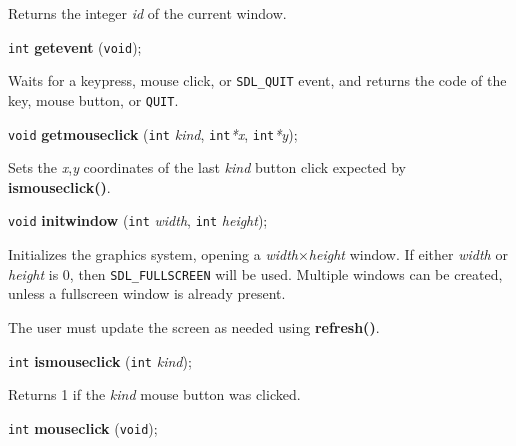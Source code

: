 \documentclass[a4paper,11pt]{article}
\newcommand{\V}{\texttt{void}}      %
\newcommand{\I}{\texttt{int}}       %
\newcommand{\func}[1]{\textbf{#1}}  %
\newcommand{\A}[1]{\emph{#1}}       %
\newcommand{\T}[1]{\texttt{#1}}     %
\newenvironment{bgi}
{ %
  \begin{snugshade}
}
{ %
  \end{snugshade}
}
\begin{document}
Returns the integer \A{id} of the current window.


\begin{bgi}
\I{} \func{getevent} (\V{});
\end{bgi}

Waits for a keypress, mouse click, or \T{SDL\_QUIT} event, and returns
the code of the key, mouse button, or \T{QUIT}.








\begin{bgi}
\V{} \func{getmouseclick} (\I{} \A{kind}, \I{}\A{*x}, \I{}\A{*y});
\end{bgi}

Sets the \A{x},\A{y} coordinates of the last \A{kind} button click
expected by \func{ismouseclick()}.


\begin{bgi}
\V{} \func{initwindow} (\I{} \A{width}, \I{} \A{height});
\end{bgi}

Initializes the graphics system, opening a \A{width}$\times$\A{height}
window. If either \A{width} or \A{height} is 0, then
\T{SDL\-\_FULL\-SCREEN} will be used. Multiple windows can be created,
unless a fullscreen window is already present.

The user must update the screen as needed using \func{refresh()}.


\begin{bgi}
\I{} \func{ismouseclick} (\I{} \A{kind});
\end{bgi}

Returns 1 if the \A{kind} mouse button was clicked.


\begin{bgi}
\I{} \func{mouseclick} (\V{});
\end{bgi}
\end{document}
